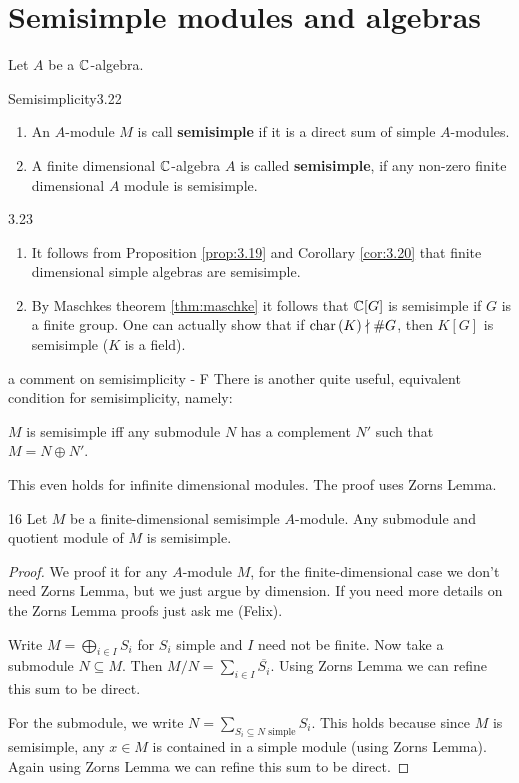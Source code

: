 \documentclass[twoside = false,	%
		headsepline,		%
		parskip = true,
		]{scrbook}						%
\begin{document}
\section{Semisimple modules and algebras}
    Let $A$ be a $\mathbb C$-algebra.
    \begin{definition}{Semisimplicity}{3.22}
        \begin{enumerate}
            \item An $A$-module $M$ is call \textbf{semisimple} if it is a direct sum of simple $A$-modules.
            \item A finite dimensional $\mathbb C$-algebra $A$ is called \textbf{semisimple}, if any non-zero finite dimensional $A$ module is semisimple.
        \end{enumerate}
    \end{definition}

    \begin{example}{}{3.23}
        \begin{enumerate}
            \item It follows from Proposition \ref{prop:3.19} and Corollary \ref{cor:3.20} that finite dimensional simple algebras are semisimple.
            \item By Maschkes theorem \ref{thm:maschke} it follows that $\mathbb C[G]$ is semisimple if $G$ is a finite group. One can actually show that if $\mathrm{char} \,(K) \nmid \#G$, then $K[G]$ is semisimple ($K$ is a field).
        \end{enumerate}
    \end{example}

    \begin{remark*}{a comment on semisimplicity - F}
        There is another quite useful, equivalent condition for semisimplicity, namely:

        $M$ is semisimple iff any submodule $N$ has a complement $N'$ such that $M = N \oplus N'$.
        
        This even holds for infinite dimensional modules. The proof uses Zorns Lemma.
    \end{remark*}
    
    \begin{exercise}{}{16}
        Let $M$ be a finite-dimensional semisimple $A$-module. Any submodule and quotient module of $M$ is semisimple.
    \end{exercise}
    \begin{proof}
        We proof it for any $A$-module $M$, for the finite-dimensional case we don't need Zorns Lemma, but we just argue by dimension. If you need more details on the Zorns Lemma proofs just ask me (Felix).
        
        Write $M = \bigoplus_{i \in I}S_i$ for $S_i$ simple and $I$ need not be finite. Now take a submodule $N \subseteq M$. Then $M/N = \sum_{i \in I} \overline{S_i}$. Using Zorns Lemma we can refine this sum to be direct.

        For the submodule, we write $N = \sum\limits_{S_i \subseteq N \text{ simple}} S_i$. This holds because since $M$ is semisimple, any $x \in M$ is contained in a simple module (using Zorns Lemma). Again using Zorns Lemma we can refine this sum to be direct.
    \end{proof}
\end{document}

